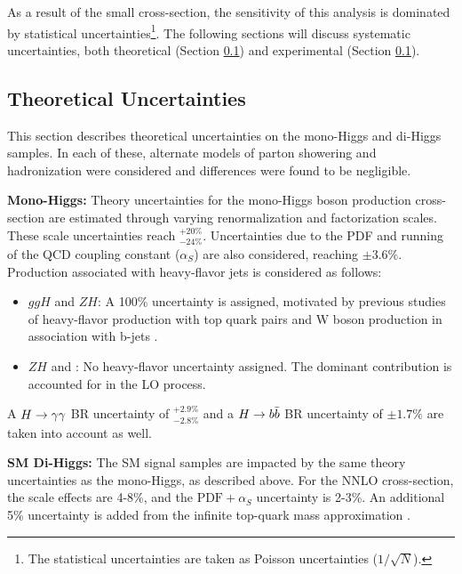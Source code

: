 As a result of the small \hh cross-section, the sensitivity of this analysis is dominated by statistical uncertainties\footnote{The statistical uncertainties are taken as Poisson uncertainties ($1/\sqrt{N}$).}. The following sections will discuss systematic uncertainties, both theoretical (Section \ref{ssec:theory-unc}) and experimental (Section \ref{ssec:theory-unc}).

\subsection{Theoretical Uncertainties} \label{ssec:theory-unc}

This section describes theoretical uncertainties on the mono-Higgs and di-Higgs samples. In each of these, alternate models of parton showering and hadronization were considered and differences were found to be negligible.

\noindent\textbf{Mono-Higgs:} Theory uncertainties for the mono-Higgs boson production cross-section are estimated through varying renormalization and factorization scales. These scale uncertainties reach $^{+20\%}_{-24\%}$. Uncertainties due to the \gls{PDF} and running of the \gls{QCD} coupling constant ($\alpha_{S}$) are also considered, reaching $\pm3.6\%$. Production associated with heavy-flavor jets is considered as follows:

\begin{itemize}
  \item $ggH$ and $ZH$: A 100\% uncertainty is assigned, motivated by previous studies of heavy-flavor production with top quark pairs \cite{heavy-flavor-top} and W boson production in association with b-jets \cite{heavy-flavor-W}.
  \item $ZH$ and \tth: No heavy-flavor uncertainty assigned. The dominant contribution is accounted for in the \gls{LO} process.
\end{itemize}

A $H\rightarrow \gamma\gamma$ \gls{BR} uncertainty of $^{+2.9\%}_{-2.8\%}$ and a $H\rightarrow b\bar{b}$ \gls{BR} uncertainty of $\pm1.7\%$ \cite{hh-crosssections} are taken into account as well.

\noindent\textbf{\gls{SM} Di-Higgs:} The \gls{SM} \hh signal samples are impacted by the same theory uncertainties as the mono-Higgs, as described above. For the \gls{NNLO} cross-section, the scale effects are 4-8\%, and the $\text{PDF}+\alpha_{S}$ uncertainty is 2-3\%. An additional 5\% uncertainty is added from the infinite top-quark mass approximation \cite{nnlo-topquark}.

